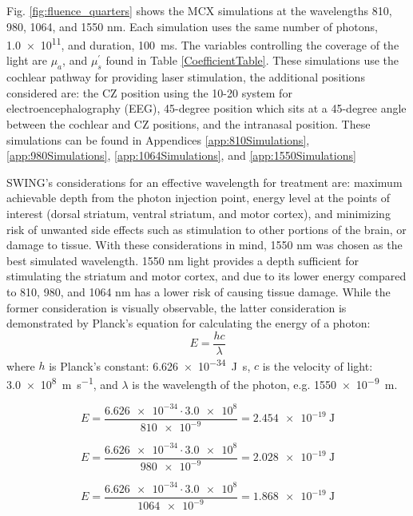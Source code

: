 \documentclass[journal,twoside,web]{ieeecolor}
\begin{document}
Fig. \ref{fig:fluence_quarters} shows the MCX simulations at the wavelengths 810, 980, 1064, and 1550 nm. Each simulation uses the same number
of photons, \num{1.0e11}, and duration, \SI{100}{\milli\second}. The variables controlling the coverage of the light are 
$\mu_{a}$, and $\mu_{s}^{'}$ found in Table \ref{CoefficientTable}. These simulations use the cochlear pathway for providing laser stimulation, the additional 
positions considered are: the CZ position using the 10-20 system for electroencephalography (EEG), 45-degree position which sits at a 45-degree angle between the 
cochlear and CZ positions, and the intranasal position. These simulations can be found in Appendices \ref{app:810Simulations}, \ref{app:980Simulations}, 
\ref{app:1064Simulations}, and \ref{app:1550Simulations}

SWING's considerations for an effective wavelength for treatment are: maximum achievable depth from the photon injection point, energy level at the points of interest 
(dorsal striatum, ventral striatum, and motor cortex), and minimizing risk of unwanted side effects such as stimulation to other portions 
of the brain, or damage to tissue. With these considerations in mind, 1550 nm was chosen as the best simulated wavelength. 1550 nm light 
provides a depth sufficient for stimulating the striatum and motor cortex, and due to its lower energy compared to 810, 980, and 1064 nm has a 
lower risk of causing tissue damage. While the former consideration is visually observable, the latter consideration is demonstrated by 
Planck's equation for calculating the energy of a photon:
\begin{equation}
    \label{eq:PhotonEnergy}
    E = \frac{hc}{\lambda}
\end{equation}
where $h$ is Planck's constant: \SI{6.626e-34}{\joule\second}, $c$ is the velocity of light: \SI{3.0e8}{\meter\per\second}, and $\lambda$ is 
the wavelength of the photon, e.g. \SI{1550e-9}{\meter}. 

\begin{equation}
    \label{eq:810Energy}
    E = \frac{\num{6.626e-34}\cdot\num{3.0e8}}{\num{810e-9}} = \SI{2.454e-19}{\joule}
\end{equation}

\begin{equation}
    \label{eq:980Energy}
    E = \frac{\num{6.626e-34}\cdot\num{3.0e8}}{\num{980e-9}} = \SI{2.028e-19}{\joule}
\end{equation}

\begin{equation}
    \label{eq:1064Energy}
    E = \frac{\num{6.626e-34}\cdot\num{3.0e8}}{\num{1064e-9}} = \SI{1.868e-19}{\joule}
\end{equation}
\end{document}
